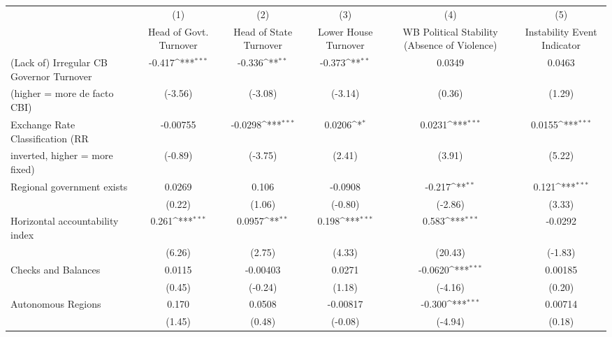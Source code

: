 {
\def\sym#1{\ifmmode^{#1}\else\(^{#1}\)\fi}
\begin{tabular}{l*{5}{c}}
\toprule
                                        &\multicolumn{1}{c}{(1)}&\multicolumn{1}{c}{(2)}&\multicolumn{1}{c}{(3)}&\multicolumn{1}{c}{(4)}&\multicolumn{1}{c}{(5)}\\
                                        &\multicolumn{1}{c}{Head of Govt. Turnover}&\multicolumn{1}{c}{Head of State Turnover}&\multicolumn{1}{c}{Lower House Turnover}&\multicolumn{1}{c}{WB Political Stability (Absence of Violence)}&\multicolumn{1}{c}{Instability Event Indicator}\\
\midrule
(Lack of) Irregular CB Governor Turnover&-0.417\sym{***}&-0.336\sym{**} &-0.373\sym{**} &0.0349         &0.0463         \\
(higher = more de facto CBI)            &(-3.56)         &(-3.08)         &(-3.14)         &(0.36)         &(1.29)         \\
\addlinespace
Exchange Rate Classification (RR        &-0.00755         &-0.0298\sym{***}&0.0206\sym{*}  &0.0231\sym{***}&0.0155\sym{***}\\
inverted, higher = more fixed)          &(-0.89)         &(-3.75)         &(2.41)         &(3.91)         &(5.22)         \\
\addlinespace
Regional government exists              &0.0269         &0.106         &-0.0908         &-0.217\sym{**} &0.121\sym{***}\\
                                        &(0.22)         &(1.06)         &(-0.80)         &(-2.86)         &(3.33)         \\
\addlinespace
Horizontal accountability index         &0.261\sym{***}&0.0957\sym{**} &0.198\sym{***}&0.583\sym{***}&-0.0292         \\
                                        &(6.26)         &(2.75)         &(4.33)         &(20.43)         &(-1.83)         \\
\addlinespace
Checks and Balances                     &0.0115         &-0.00403         &0.0271         &-0.0620\sym{***}&0.00185         \\
                                        &(0.45)         &(-0.24)         &(1.18)         &(-4.16)         &(0.20)         \\
\addlinespace
Autonomous Regions                      &0.170         &0.0508         &-0.00817         &-0.300\sym{***}&0.00714         \\
                                        &(1.45)         &(0.48)         &(-0.08)         &(-4.94)         &(0.18)         \\

\end{tabular}}
